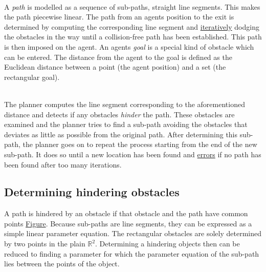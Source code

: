 \documentclass{article}
\begin{document}
\ \\
A \emph{path} is modelled as a sequence of sub-paths, straight line segments. This makes the path piecewise linear.
The path from an agents position to the exit is determined by computing the corresponding line segment and \underline{iteratively} dodging the obstacles in the way until a collision-free path has been established. This path is then imposed on the agent.
An agents \emph{goal} is a special kind of obstacle which can be entered. The distance from the agent to the goal is defined as the Euclidean distance between a point (the agent position) and a set (the rectangular goal).

\ \\
The planner computes the line segment corresponding to the aforementioned distance and detects if any obstacles \emph{hinder} the path. These obstacles are examined and the planner tries to find a sub-path avoiding the obstacles that deviates as little as possible from the original path. After determining this sub-path, the planner goes on to repeat the process starting from the end of the new sub-path. It does so until a new location has been found and \underline{errors} if no path has been found after too many iterations.
\subsection{Determining hindering obstacles}
A path is hindered by an obstacle if that obstacle and the path have common points \underline{Figure}. Because sub-paths are line segments, they can be expressed as a simple linear parameter equation. The rectangular obstacles are solely determined by two points in the plain $\mathbb{R}^2$. Determining a hindering objects then can be reduced to finding a parameter for which the parameter equation of the sub-path lies between the points of the object.
\end{document}

